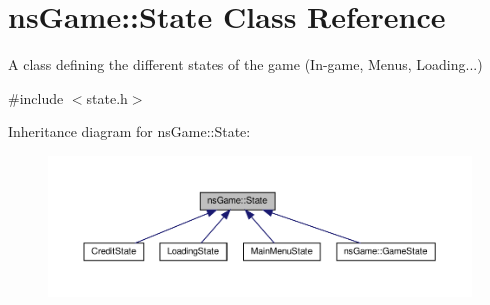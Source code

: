 \hypertarget{classns_game_1_1_state}{}\section{ns\+Game\+:\+:State Class Reference}
\label{classns_game_1_1_state}


A class defining the different states of the game (In-\/game, Menus, Loading...)  




{\ttfamily \#include $<$state.\+h$>$}



Inheritance diagram for ns\+Game\+:\+:State\+:
\nopagebreak
\begin{figure}[H]
\begin{center}
\leavevmode
\includegraphics[width=350pt]{classns_game_1_1_state__inherit__graph}
\end{center}
\end{figure}

